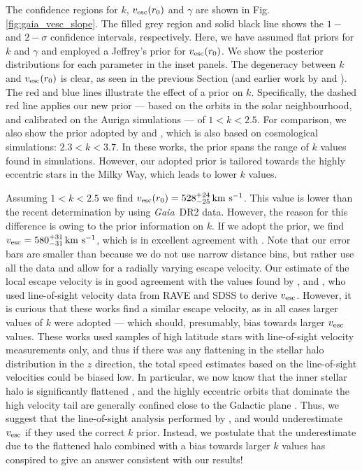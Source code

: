 \documentclass[fleqn,usenatbib]{mnras}
\newcommand{\kms}        {\,{\rm km}\,\,{\rm s}^{-1}}
\newcommand{\gaia}		{\emph{Gaia}}
\begin{document}
The confidence regions for $k$, $v_{\rm esc}(r_0)$ and $\gamma$ are shown in Fig. \ref{fig:gaia_vesc_slope}. The filled grey region and solid black line shows the $1-$ and $2-\sigma$ confidence intervals, respectively. Here, we have assumed flat priors for $k$ and $\gamma$ and employed a Jeffrey's prior for $v_{\rm esc}(r_0)$. We show the posterior distributions for each parameter in the inset panels. The degeneracy between $k$ and $v_{\rm esc}(r_0)$ is clear, as seen in the previous Section (and earlier work by \citealt{smith07} and \citealt{piffl14}). The red and blue lines illustrate the effect of a prior on $k$. Specifically, the dashed red line applies our new prior --- based on the orbits in the solar neighbourhood, and calibrated on the Auriga simulations --- of $1 < k < 2.5$. For comparison, we also show the prior adopted by \cite{piffl14} and \cite{monari18}, which is also based on cosmological simulations: $2.3 < k < 3.7$. In these works, the prior spans the range of $k$ values found in simulations. However, our adopted prior is tailored towards the highly eccentric stars in the Milky Way, which leads to lower $k$ values.

Assuming $ 1 < k < 2.5$ we find $v_{\rm esc}(r_0) = 528^{+24}_{-25} \kms$. This value is lower than the recent determination by \cite{monari18} using \gaia\ DR2 data. However, the reason for this difference is owing to the prior information on $k$. If we adopt the \cite{piffl14} prior, we find $v_{\rm esc} = 580^{+31}_{-31} \kms$, which is in excellent agreement with \cite{monari18}. Note that our error bars are smaller than \cite{monari18} because we do not use narrow distance bins, but rather use all the data and allow for a radially varying escape velocity. Our estimate of the local escape velocity is in good agreement with the values found by \cite{smith07}, \cite{piffl14} and \cite{williams17}, who used line-of-sight velocity data from RAVE and SDSS to derive $v_{\rm esc}$. However,  it is curious that these works find a similar escape velocity, as in all cases larger values of $k$ were adopted --- which should, presumably, bias towards larger $v_{\rm esc}$ values. These works used samples of high latitude stars with line-of-sight velocity measurements only, and thus if there was any flattening in the stellar halo distribution in the $z$ direction, the total speed estimates based on the line-of-sight velocities could be biased low. In particular, we now know that the inner stellar halo is significantly flattened \citep[e.g.][]{iorio18}, and the highly eccentric orbits that dominate the high velocity tail are generally confined close to the Galactic plane \citep[e.g.][]{myeong18}. Thus, we suggest that the line-of-sight analysis performed by \cite{smith07}, \cite{piffl14} and \cite{williams17} would underestimate $v_{\rm esc}$ if they used the correct $k$ prior. Instead, we postulate that the underestimate due to the flattened halo combined with a bias towards larger $k$ values has conspired to give an answer consistent with our results!
\end{document}
